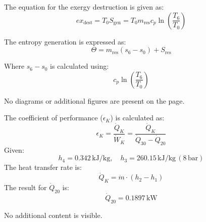 The equation for the exergy destruction is given as:  
\[
ex_{\text{dest}} = T_0 S_{\text{gen}} = T_0 m_{\text{res}} c_p \ln \left( \frac{T_6}{T_0} \right)
\]  

The entropy generation is expressed as:  
\[
\Theta = m_{\text{res}} (s_6 - s_0) + S_{\text{res}}
\]  

Where \( s_6 - s_0 \) is calculated using:  
\[
c_p \ln \left( \frac{T_6}{T_0} \right)
\]  

No diagrams or additional figures are present on the page.

The coefficient of performance (\(\epsilon_K\)) is calculated as:  
\[
\epsilon_K = \frac{\dot{Q}_K}{\dot{W}_K} = \frac{\dot{Q}_K}{\dot{Q}_{30} - \dot{Q}_{20}}
\]  
Given:  
\[
h_4 = 0.342 \, \text{kJ/kg}, \quad h_3 = 260.15 \, \text{kJ/kg} \, (8 \, \text{bar})
\]  
The heat transfer rate is:  
\[
\dot{Q}_K = \dot{m} \cdot (h_2 - h_1)
\]  
The result for \(\dot{Q}_{20}\) is:  
\[
\dot{Q}_{20} = 0.1897 \, \text{kW}
\]  

No additional content is visible.